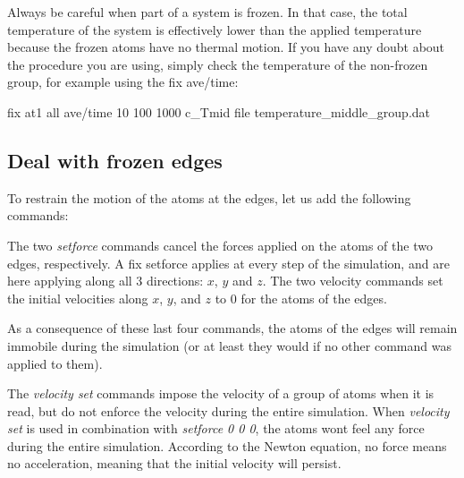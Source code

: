 \begin{tcolorbox}[colback=mylightblue!5!white,colframe=mylightblue!75!black,title=Deal with semi-frozen system]
Always be careful when part of a system is frozen. In that 
case, the total temperature of the system is effectively lower
than the applied temperature because the frozen atoms 
have no thermal motion. If you have any doubt about the procedure
you are using, simply check the temperature of the non-frozen group, for
example using the fix ave/time:
\begin{lcverbatim}
fix at1 all ave/time 10 100 1000 c_Tmid file temperature_middle_group.dat
\end{lcverbatim}

\noindent \end{tcolorbox}

\subsection{Deal with frozen edges}

\noindent To restrain the motion of the atoms at the edges, let us add the
following commands:

\begin{lcverbatim}
\end{lcverbatim}

\noindent The two \textit{setforce} commands cancel the forces applied on the
atoms of the two edges, respectively. A fix setforce applies at every step of the
simulation, and are here applying along all 3 directions: $x$, $y$
and $z$. The two velocity commands set the initial velocities along $x$,
$y$, and $z$ to 0 for the atoms of the edges. 

As a consequence of these last four commands, the atoms of the edges will remain
immobile during the simulation (or at least they would if no other command was
applied to them).

\begin{tcolorbox}[colback=mylightblue!5!white,colframe=mylightblue!75!black,title=On imposing a constant velocity to a system]
The \textit{velocity set} commands impose the velocity of a group of atoms when it is 
read, but do not enforce the velocity during the entire simulation. 
When \textit{velocity set} is used in combination with \textit{setforce 0 0 0}, the atoms
wont feel any force during the entire simulation. According to the Newton equation,
no force means no acceleration, meaning that the initial velocity will persist.
\end{tcolorbox}

